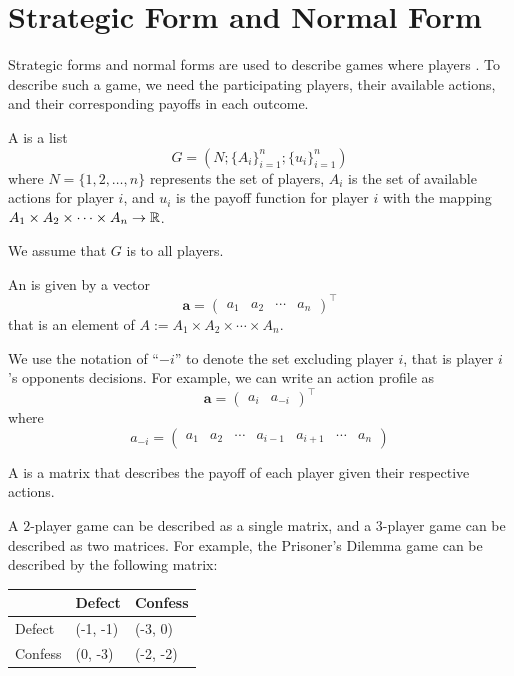 \section{Strategic Form and Normal Form}
Strategic forms and normal forms are used to describe games where players . To describe such a game, we need the participating players, their available actions, and their corresponding payoffs in each outcome.
\begin{definition}
    A  is a list
    $$G = (N ; \{A_i\}_{i = 1}^n; \{u_i\}_{i = 1}^n)$$
    where $N = \{1, 2, \dots, n\}$ represents the set of players, $A_i$ is the set of available actions for player $i$, and $u_i$ is the payoff function for player $i$ with the mapping $A_1 \times A_2 \times \cdots \times A_n \to \mathbb{R}$.
\end{definition}
We assume that $G$ is  to all players.
\begin{definition}
    An  is given by a vector
    $$\mathbf{a} = \begin{pmatrix}
        a_1 & a_2 & \cdots & a_n
    \end{pmatrix}^\top$$
    that is an element of $A := A_1 \times A_2 \times \cdots \times A_n$.
\end{definition}
We use the notation of ``$-i$'' to denote the set excluding player $i$, that is player $i$'s opponents decisions. For example, we can write an action profile as
$$\mathbf{a} = \begin{pmatrix}
    a_i & a_{-i}
\end{pmatrix}^\top$$
where
$$a_{-i} = \begin{pmatrix}
    a_1 & a_2 & \cdots & a_{i - 1} & a_{i + 1} & \cdots & a_n
\end{pmatrix}$$
\begin{definition}
    A  is a matrix that describes the payoff of each player given their respective actions.
\end{definition}
A $2$-player game can be described as a single matrix, and a $3$-player game can be described as two matrices. For example, the Prisoner's Dilemma game can be described by the following matrix:
\begin{center}
    \begin{tabular}{|l|l|l|}
        \hline
        & Defect & Confess \\ \hline
       Defect & (-1, -1) & (-3, 0) \\ \hline
       Confess & (0, -3) & (-2, -2) \\ \hline
    \end{tabular}
\end{center}
